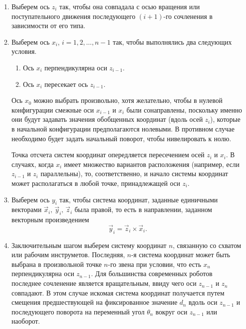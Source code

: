 \documentclass[oneside, final, 14pt]{extarticle}
\begin{document}
\begin{enumerate}
  \item Выберем ось \(z_i\)	так, чтобы она совпадала с осью вращения или поступательного движения последующего \((i + 1)\)-го сочленения в зависимости от его типа.
  \item Выберем ось \(x_i\), \(i = 1, 2, \ldots, n - 1\) так, чтобы выполнялись два следующих условия.
  \begin{enumerate}
    \item Ось \(x_i\) перпендикулярна оси \(z_{i-1}\).
	\item Ось \(x_i\) пересекает ось \(z_{i - 1}\).
  \end{enumerate}
  Ось \(x_0\) можно выбрать произвольно, хотя желательно, чтобы в нулевой конфигурации смежные оси \(x_{i-1}\) и \(x_i\) были сонаправлены, поскольку именно они будут задавать значения обобщенных координат (вдоль осей \(z_i\)), которые в начальной конфигурации предполагаются нолевыми.
  В противном случае необходимо будет задать начальный поворот, чтобы нивелировать к нолю.
  \par
  Точка отсчета систем координат опередляется пересечением осей \(z_i\)  и \(x_i\).
  В случаях, когда \(x_i\) имеет множество вариантов расположения (например, если \(z_{i-1}\) и \(z_i\) параллельны), то, соответственно, и начало системы координат может располагаться в любой точке, принадлежащей оси \(z_i\).
  \item Выберем ось \(y_i\) так, чтобы система координат, заданные единичными векторами \(\vec{x}_i,\,\vec{y}_i,\,\vec{z}_i\) была правой, то есть в направлении, заданном векторным произведением
  \begin{displaymath}
    \vec{y}_i = \vec{z}_i \times \vec{x}_i
	.
  \end{displaymath}
  \item Заключительным шагом выберем систему координат \(n\), связанную со схватом или рабочим инструметов.
  Последняя, \(n\)-я система координат может быть выбрана в произвольной точке \(n\)-го звена при условии, что есть \(x_n\) перпендикулярна оси \(z_{n-1}\).
  Для большинства современных роботов последнее сочленение является вращательным, ввиду чего оси \(z_{n - 1}\) и \(z_n\) совпадают. В этом случае искомая система координат получается путем смещения предшествующей на фиксированное значение \(d_n\) вдоль оси \(z_{n - 1}\) и последующего поворота на переменный угол \(\theta_n\) вокруг оси \(z_{n-1}\) или наоборот.
\end{enumerate}
\par
\end{document}
